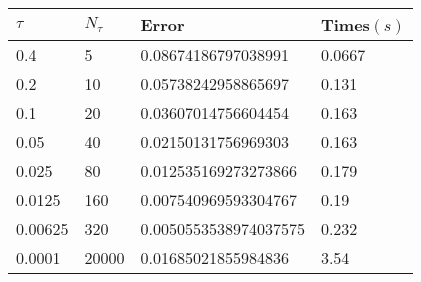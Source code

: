 \begin{tabular}{llll} 
\hline 
$\tau$  & $N_\tau$  &  Error & Times$(s)$  \\ 
\hline \hline 
0.4  & 5 & \num{0.08674186797038991} & 0.0667 \\ 
0.2  & 10 & \num{0.05738242958865697} & 0.131 \\ 
0.1  & 20 & \num{0.03607014756604454} & 0.163 \\ 
0.05  & 40 & \num{0.02150131756969303} & 0.163 \\ 
0.025  & 80 & \num{0.012535169273273866} & 0.179 \\ 
0.0125  & 160 & \num{0.007540969593304767} & 0.19 \\ 
0.00625  & 320 & \num{0.0050553538974037575} & 0.232 \\ 
0.0001  & 20000 & \num{0.01685021855984836} & 3.54 \\ 
\hline 
\end{tabular} 
